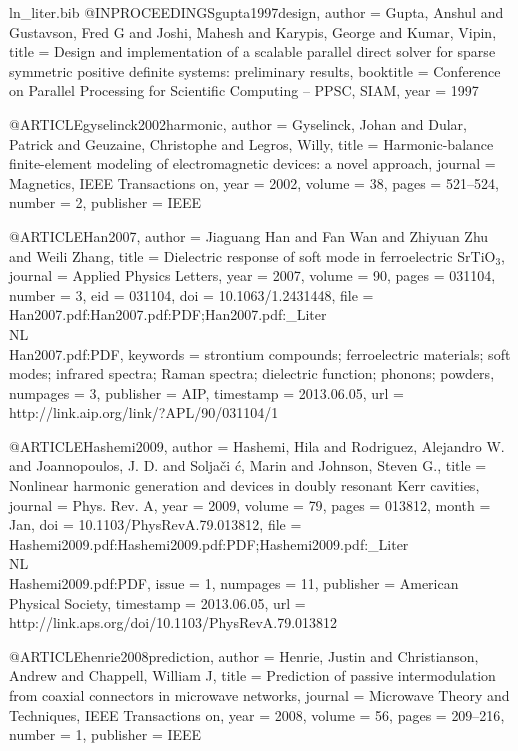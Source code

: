 \begin{filecontents*}{ln_liter.bib}
@INPROCEEDINGS{gupta1997design,
  author = {Gupta, Anshul and Gustavson, Fred G and Joshi, Mahesh and Karypis,
	George and Kumar, Vipin},
  title = {Design and implementation of a scalable parallel direct solver for
	sparse symmetric positive definite systems: preliminary results},
  booktitle = {Conference on Parallel Processing for Scientific Computing -- PPSC,
	SIAM},
  year = {1997}
}

@ARTICLE{gyselinck2002harmonic,
  author = {Gyselinck, Johan and Dular, Patrick and Geuzaine, Christophe and
	Legros, Willy},
  title = {Harmonic-balance finite-element modeling of electromagnetic devices:
	a novel approach},
  journal = {Magnetics, IEEE Transactions on},
  year = {2002},
  volume = {38},
  pages = {521--524},
  number = {2},
  publisher = {IEEE}
}

@ARTICLE{Han2007,
  author = {Jiaguang Han and Fan Wan and Zhiyuan Zhu and Weili Zhang},
  title = {Dielectric response of soft mode in ferroelectric {SrTiO$_3$}},
  journal = {Applied Physics Letters},
  year = {2007},
  volume = {90},
  pages = {031104},
  number = {3},
  eid = {031104},
  doi = {10.1063/1.2431448},
  file = {Han2007.pdf:Han2007.pdf:PDF;Han2007.pdf:_Liter\\NL\\Han2007.pdf:PDF},
  keywords = {strontium compounds; ferroelectric materials; soft modes; infrared
	spectra; Raman spectra; dielectric function; phonons; powders},
  numpages = {3},
  publisher = {AIP},
  timestamp = {2013.06.05},
  url = {http://link.aip.org/link/?APL/90/031104/1}
}

@ARTICLE{Hashemi2009,
  author = {Hashemi, Hila and Rodriguez, Alejandro W. and Joannopoulos, J. D.
	and Solja\ifmmode {}\else \v{c}\fi{}i\ifmmode {}\else
	\'{c}\fi{}, Marin and Johnson, Steven G.},
  title = {Nonlinear harmonic generation and devices in doubly resonant Kerr
	cavities},
  journal = {Phys. Rev. A},
  year = {2009},
  volume = {79},
  pages = {013812},
  month = {Jan},
  doi = {10.1103/PhysRevA.79.013812},
  file = {Hashemi2009.pdf:Hashemi2009.pdf:PDF;Hashemi2009.pdf:_Liter\\NL\\Hashemi2009.pdf:PDF},
  issue = {1},
  numpages = {11},
  publisher = {American Physical Society},
  timestamp = {2013.06.05},
  url = {http://link.aps.org/doi/10.1103/PhysRevA.79.013812}
}

@ARTICLE{henrie2008prediction,
  author = {Henrie, Justin and Christianson, Andrew and Chappell, William J},
  title = {Prediction of passive intermodulation from coaxial connectors in
	microwave networks},
  journal = {Microwave Theory and Techniques, IEEE Transactions on},
  year = {2008},
  volume = {56},
  pages = {209--216},
  number = {1},
  publisher = {IEEE}
}


\end{filecontents*}

